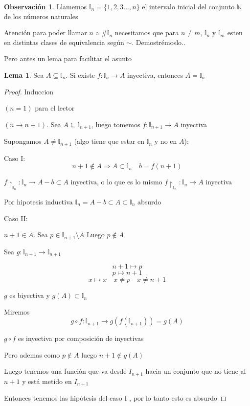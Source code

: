 \documentclass[12pt]{article}
\newcommand{\I}{\mathbb{I}}
\newcommand{\N}{\mathbb{N}}
\newcommand{\Ra}{\Rightarrow}
\newcommand{\ra}{\rightarrow}
\theoremstyle{definition}
\newtheorem*{remark}{Observación}
\newtheorem{lemma}[theorem]{Lema}
\begin{document}
\begin{remark}
Llamemos $\I_{n} = \{1,2,3 \dots ,n\}$ el intervalo inicial del conjunto $\N$ de los números naturales

Atención para poder llamar $n$ a $\# \I_{n}$ necesitamos que para $n \neq m$, $\I_{n}$ y $\I_{m}$ esten en distintas clases de equivalencia según $\sim$. Demostrémoslo..
\end{remark}
Pero antes un lema para facilitar el asunto 
\begin{lemma}
  
  Sea $A \subseteq \I_{n}$. Si existe $f:\I_{n} \ra A$ inyectiva, entonces $A = \I_{n}$
\end{lemma}


\begin{proof}
    Induccion

  $(n=1)$ para el lector

  $(n \ra n + 1) $. Sea $A \subseteq \I_{n+1}$, luego tomemos $f: \I_{n+1} \ra A$ inyectiva

  Supongamos $A \neq \I_{n+1}$ (algo tiene que estar en $\I_{n}$ y no en $A$):

    Caso I: $$n+1 \notin A \Ra A \subset \I_{n} \quad b = f(n+1)$$

    \begin{center}$f\restriction_{\I_{n}} : \I_{n} \ra A - {b} \subset A$ inyectiva, o lo que es lo mismo $f \restriction_{\I_{n}}:\I_{n} \ra A$ inyectiva \end{center}

    Por hipotesis inductiva $\I_{n} = A - {b} \subset A \subset \I_{n}$ absurdo

    Caso II: \begin{center} $n+1 \in A$. Sea $p \in \I_{n+1} \setminus A $ Luego $p \notin A$ \end{center}

    Sea $g: \I_{n+1} \ra \I_{n+1}$
    
   $$n+1 \mapsto p$$
    $$p \mapsto n+1$$
  $$x \mapsto x \quad x \neq p \quad x \neq n+1$$

  $g$ es biyectiva  y $g(A) \subset \I_{n}$

  Miremos $$g \circ f: \I_{n+1} \ra g(f(\I_{n+1})) = g(A)  $$

  $g \circ f$ es inyectiva por composición de inyectivas

  Pero ademas como $ p \notin A$ luego $n + 1 \notin g(A) $

  Luego tenemos una función que va desde $I_{n+1}$ hacia un conjunto que no tiene al $n + 1$ y está metido en $I_{n+1}$

  Entonces tenemos las hipótesis del caso I , por lo tanto esto es absurdo

  \end{proof}
\end{document}
